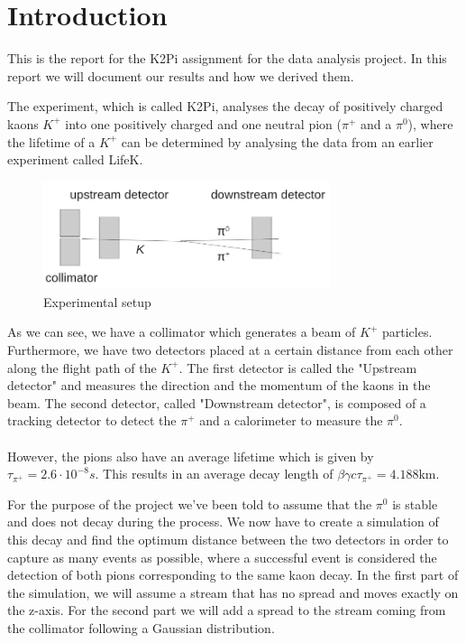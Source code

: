 \documentclass[a4paper,parskip,11pt, DIV12]{scrreprt}
\begin{document}
	\renewcommand{\chaptermark}[1]{ \markboth{#1}{} } %
	
	
	
	\chapter{Introduction}
	
	This is the report for the K2Pi assignment for the data analysis project. In this report we will document our results and how we derived them.
	
	The experiment, which is called K2Pi, analyses the decay of positively charged kaons $K^+$ into one positively charged and one neutral pion ($\pi^+$ and a $\pi^0$), where the lifetime of a $K^+$ can be determined by analysing the data from an earlier experiment called LifeK.
	
	\begin{figure}[H] 
		\centering
		\includegraphics[width=0.75\textwidth]{ExperimentSetup.jpg} 
		\caption{Experimental setup}
		\label{fig:1}    
	\end{figure}	
	
	As we can see, we have a collimator which generates a beam of $K^+$ particles. Furthermore, we have two detectors placed at a certain distance from each other along the flight path of the $K^+$. The first detector is called the "Upstream detector" and measures the direction and the momentum of the kaons in the beam. The second detector, called "Downstream detector", is composed of a tracking detector to detect the $\pi^+$ and a calorimeter to measure the $\pi^0$.
	\\
	\\
	However, the pions also have an average lifetime which is given by $\tau_{\pi^+} = 2.6 \cdot 10^{-8}s$. This results in an average decay length of $\beta \gamma c\tau_{\pi^+} = 4.188$km.
	
	For the purpose of the project we've been told to assume that the $\pi^0$ is stable and does not decay during the process. We now have to create a simulation of this decay and find the optimum distance between the two detectors in order to capture as many events as possible, where a successful event is considered the detection of both pions corresponding to the same kaon decay. In the first part of the simulation, we will assume a stream that has no spread and moves exactly on the z-axis. For the second part we will add a spread to the stream coming from the collimator following a Gaussian distribution.
	
\end{document}
